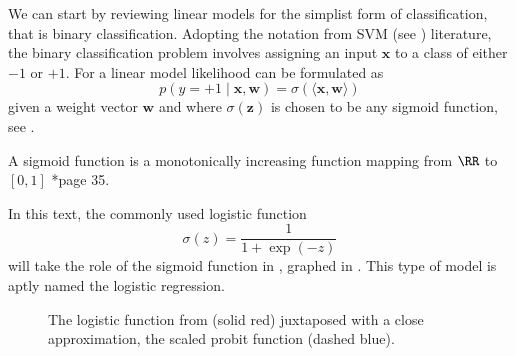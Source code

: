 We can start by reviewing linear models for the simplist form of classification, that is binary classification. Adopting the notation from SVM (see ) literature, the binary classification problem involves assigning an input $\bm{x}$ to a class of either $-1$ or $+1$. For a linear model likelihood can be formulated as
\begin{equation} \label{eq: GPC-lin-model-1}
    p \left( y=+1 \mid \bm{x} , \bm{w} \right) = \sigma \left( \langle \bm{x} , \bm{w} \rangle \right)
\end{equation}
given a weight vector $\bm{w}$ and where $\sigma (\bm{z})$ is chosen to be any sigmoid function, see .
\begin{defe} \label{defe: sigmoid-function}
    A sigmoid function is a monotonically increasing function mapping from $\RR$ to $\left[ 0,1 \right]$ \cite{RasmussenCarlEdward2006Gpfm}*{page 35}.
\end{defe}
In this text, the commonly used logistic function
\begin{equation} \label{eq: logistic-function}
    \sigma (z) = \frac{1}{1 + \exp (-z)}
\end{equation}
will take the role of the sigmoid function in , graphed in . This type of model is aptly named the logistic regression.
\begin{figure}[h]
    \centering
    \caption{The logistic function from  (solid red) juxtaposed with a close approximation, the scaled probit function (dashed blue).}
    \label{fig: logistic-func-and-probit}
\end{figure}
